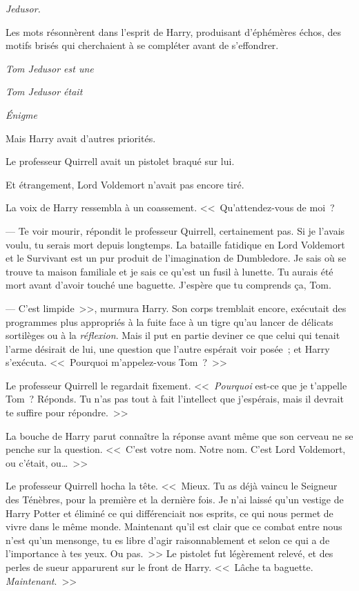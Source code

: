 
 \emph{Jedusor.}

\hplettrineextrapara
Les mots résonnèrent dans l'esprit de Harry, produisant d'éphémères échos, des motifs brisés qui cherchaient à se compléter avant de s'effondrer.

\emph{Tom Jedusor est une}

\emph{Tom Jedusor était}

\emph{Énigme}

Mais Harry avait d'autres priorités.

Le professeur Quirrell avait un pistolet braqué sur lui.

Et étrangement, Lord Voldemort n'avait pas encore tiré.

La voix de Harry ressembla à un coassement.
<<~Qu'attendez-vous de moi~?

--- Te voir mourir, répondit le professeur Quirrell, certainement pas. Si je l'avais voulu, tu serais mort depuis longtemps. La bataille fatidique en Lord Voldemort et le Survivant est un pur produit de l'imagination de Dumbledore. Je sais où se trouve ta maison familiale et je sais ce qu'est un fusil à lunette. Tu aurais été mort avant d'avoir touché une baguette. J'espère que tu comprends ça, Tom.

--- C'est limpide~>>, murmura Harry. Son corps tremblait encore, exécutait des programmes plus appropriés à la fuite face à un tigre qu'au lancer de délicats sortilèges ou à la \emph{réflexion}. Mais il put en partie deviner ce que celui qui tenait l'arme désirait de lui, une question que l'autre espérait voir posée~; et Harry s'exécuta. <<~Pourquoi m'appelez-vous Tom~?~>>

Le professeur Quirrell le regardait fixement. <<~\emph{Pourquoi} est-ce que je t'appelle Tom~? Réponds. Tu n'as pas tout à fait l'intellect que j'espérais, mais il devrait te suffire pour répondre.~>>

La bouche de Harry parut connaître la réponse avant même que son cerveau ne se penche sur la question. <<~C'est votre nom. Notre nom. C'est Lord Voldemort, ou c'était, ou…~>>

Le professeur Quirrell hocha la tête. <<~Mieux. Tu as déjà vaincu le Seigneur des Ténèbres, pour la première et la dernière fois. Je n'ai laissé qu'un vestige de Harry Potter et éliminé ce qui différenciait nos esprits, ce qui nous permet de vivre dans le même monde. Maintenant qu'il est clair que ce combat entre nous n'est qu'un mensonge, tu es libre d'agir raisonnablement et selon ce qui a de l'importance à tes yeux. Ou pas.~>> Le pistolet fut légèrement relevé, et des perles de sueur apparurent sur le front de Harry. <<~Lâche ta baguette. \emph{Maintenant}.~>>

